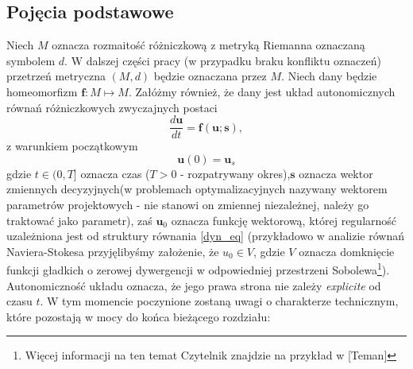\documentclass[12pt]{article}
\begin{document}
\subsection{Pojęcia podstawowe}
Niech $ M $ oznacza rozmaitość różniczkową z metryką Riemanna oznaczaną symbolem $ d $. W dalszej części pracy (w przypadku braku konfliktu oznaczeń) przetrzeń metryczna $ (M,d) $ będzie oznaczana przez $ M $. Niech dany będzie homeomorfizm $  \textbf{f}: M \mapsto M$.
Załóżmy również, że dany jest układ autonomicznych równań różniczkowych zwyczajnych postaci
\begin{equation}
\frac{d\textbf{u}}{dt} =  \textbf{f}(\textbf{u};\textbf{s}),
\label{dyn_eq}
\end{equation}
z warunkiem początkowym
\begin{equation}
\textbf{u}(0) = \textbf{u}_{s}
\label{U1}
\end{equation}
gdzie $t\in(0,T]$ oznacza czas ($ T>0 $ - rozpatrywany okres),$ \textbf{s} $ oznacza wektor zmiennych decyzyjnych(w problemach optymalizacyjnych nazywany wektorem parametrów projektowych  - nie stanowi on zmiennej niezależnej, należy go traktować jako parametr), zaś $ \textbf{u}_{0} $ oznacza funkcję wektorową, której regularność uzależniona jest od struktury równania \ref{dyn_eq} (przykładowo w analizie równań Naviera-Stokesa przyjęlibyśmy założenie, że $ u_{0}\in V $, gdzie $ V $ oznacza domknięcie funkcji gładkich o zerowej dywergencji w odpowiedniej przestrzeni Sobolewa\footnote{Więcej informacji na ten temat Czytelnik znajdzie na przykład w [Teman]}). Autonomiczność układu oznacza, że jego prawa strona nie zależy \textit{explicite} od czasu $ t $.\newline
W tym momencie poczynione zostaną uwagi o charakterze technicznym, które pozostają w mocy do końca bieżącego rozdziału:
\end{document}
